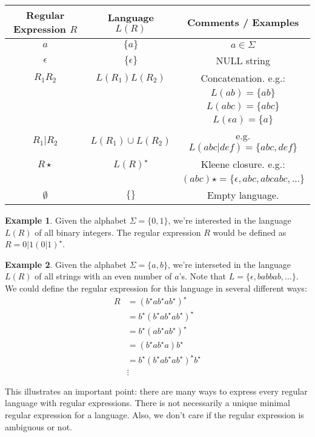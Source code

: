 \documentclass[]{article}
\theoremstyle{definition}
\newtheorem{ex}{Example}[section]
\begin{document}
			\begin{center}
				\begin{tabular}{c|c|c}
					Regular Expression $R$ & Language $L(R)$ & Comments / Examples \\ \hline
					$a$ & $\{ a \}$ & $a \in \Sigma$ \\
					$\epsilon$ & $\{ \epsilon \}$ &  NULL string \\
					$R_1 R_2$ & $L(R_1) L(R_2)$ & Concatenation. e.g.:  \\
					& & $L(ab) = \{ab\}$ \\
					& & $L(abc) = \{abc\}$ \\
					& & $L(\epsilon a) = \{a\}$ \\
					$R_1 | R_2$ & $L(R_1) \cup L(R_2)$ & e.g. $L(abc | def) = \{abc, def\}$ \\
					$R \star$ & $L(R)^\star$ & Kleene closure. e.g.: \\
					& & $(abc) \star = \{ \epsilon, abc, abcabc, \ldots \}$ \\
					$\emptyset$ & $\{ \}$ & Empty language.
				\end{tabular}
			\end{center}

			\begin{ex}
				Given the alphabet $\Sigma = \{ 0, 1 \}$, we're interested in the language $L(R)$ of all binary integers. The regular expression $R$ would be defined as $R = 0 | 1(0 | 1)^\star$.
			\end{ex}

			\begin{ex}
				Given the alphabet $\Sigma = \{ a, b \}$, we're interseted in the language $L(R)$ of all strings with an even number of $a$'s. Note that $L = \{ \epsilon, babbab, \ldots \}$. We could define the regular expression for this language in several different ways:
				\begin{align*}
					R &= (b^\star{} ab^\star{} ab^\star{})^\star \\
					&= b^\star{}(b^\star{}ab^\star{}ab^\star{})^\star \\
					&= b^\star{}(ab^\star{}ab^\star{})^\star \\
					&= (b^\star{}ab^\star{}a)b^\star \\
					&= b^\star{}(b^\star{}ab^\star{}ab^\star{})^\star{} b^\star \\
					&\vdots
				\end{align*}

				This illustrates an important point: there are many ways to express every regular language with regular expressions. There is not necessarily a unique minimal regular expression for a language. Also, we don't care if the regular expression is ambiguous or not.
			\end{ex}
			
\end{document}

